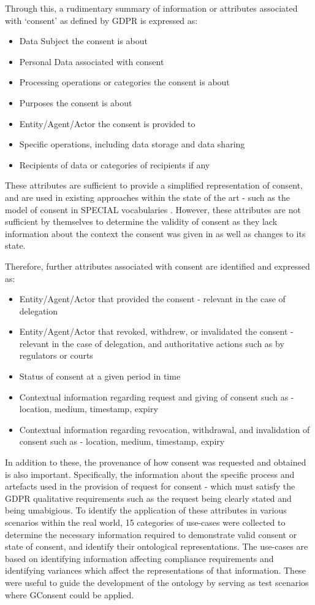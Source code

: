 Through this, a rudimentary summary of information or attributes associated with `consent' as defined by GDPR is expressed as:
\begin{itemize}
    \item Data Subject the consent is about
    \item Personal Data associated with consent
    \item Processing operations or categories the consent is about
    \item Purposes the consent is about
    \item Entity/Agent/Actor the consent is provided to
    \item Specific operations, including data storage and data sharing
    \item Recipients of data or categories of recipients if any
\end{itemize}
These attributes are sufficient to provide a simplified representation of consent, and are used in existing approaches within the state of the art - such as the model of consent in SPECIAL vocabularies \cite{}. However, these attributes are not sufficient by themselves to determine the validity of consent as they lack information about the context the consent was given in as well as changes to its state.

Therefore, further attributes associated with consent are identified and expressed as:
\begin{itemize}
    \item Entity/Agent/Actor that provided the consent - relevant in the case of delegation
    \item Entity/Agent/Actor that revoked, withdrew, or invalidated the consent - relevant in the case of delegation, and authoritative actions such as by regulators or courts
    \item Status of consent at a given period in time
    \item Contextual information regarding request and giving of consent such as - location, medium, timestamp, expiry
    \item Contextual information regarding revocation, withdrawal, and invalidation of consent such as - location, medium, timestamp, expiry
\end{itemize}
In addition to these, the provenance of how consent was requested and obtained is also important.
Specifically, the information about the specific process and artefacts used in the provision of request for consent - which must satisfy the GDPR qualitative requirements such as the request being clearly stated and being umabigious.
To identify the application of these attributes in various scenarios within the real world, 15 categories of use-cases were collected to determine the necessary information required to demonstrate valid consent or state of consent, and identify their ontological representations.
The use-cases are based on identifying information affecting compliance requirements and identifying variances which affect the representations of that information.
These were useful to guide the development of the ontology by serving as test scenarios where GConsent could be applied.

